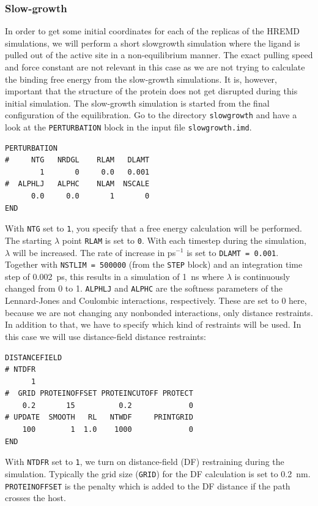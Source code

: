 \subsubsection{Slow-growth}
In order to get some initial coordinates for each of the replicas of the HREMD simulations, we will perform a short slowgrowth simulation where the ligand is pulled out of the active site in a non-equilibrium manner. 
The exact pulling speed and force constant are not relevant in this case as we are not trying to calculate the binding free energy from the slow-growth simulations. 
It is, however, important that the structure of the protein does not get disrupted during this initial simulation. 
The slow-growth simulation is started from the final configuration of the equilibration. 
Go to the directory \texttt{slowgrowth} and have a look at the \texttt{PERTURBATION} block in the input file \texttt{slowgrowth.imd}. 
\begin{lstlisting}
PERTURBATION
#     NTG   NRDGL    RLAM   DLAMT
        1       0     0.0   0.001
#  ALPHLJ   ALPHC    NLAM  NSCALE
      0.0     0.0       1       0
END
\end{lstlisting}
With \texttt{NTG} set to \texttt{1}, you specify that a free energy calculation will be performed. 
The starting $\lambda$ point \texttt{RLAM} is set to \texttt{0}. With each timestep during the simulation, $\lambda$ will be increased. The rate of increase in ps$^{-1}$ is set to \texttt{DLAMT = 0.001}. 
Together with \texttt{NSTLIM = 500000} (from the \texttt{STEP} block) and an integration time step of 0.002~ps, this results in a simulation of 1~ns where $\lambda$ is continuously changed from 0 to 1. 
\texttt{ALPHLJ} and \texttt{ALPHC} are the softness parameters of the Lennard-Jones and Coulombic interactions, respectively. 
These are set to 0 here, because we are not changing any nonbonded interactions, only distance restraints. 
In addition to that, we have to specify which kind of restraints will be used. In this case we will use distance-field distance restraints:
\begin{lstlisting}
DISTANCEFIELD
# NTDFR
      1
#  GRID PROTEINOFFSET PROTEINCUTOFF PROTECT
    0.2       15          0.2             0
# UPDATE  SMOOTH   RL   NTWDF     PRINTGRID
    100        1  1.0    1000             0
END
\end{lstlisting}
With \texttt{NTDFR} set to \texttt{1}, we turn on distance-field (DF) restraining during the simulation. Typically the grid size (\texttt{GRID}) for the DF calculation is set to 0.2~nm. 
\texttt{PROTEINOFFSET} is the penalty which is added to the DF distance if the path crosses the host. 
